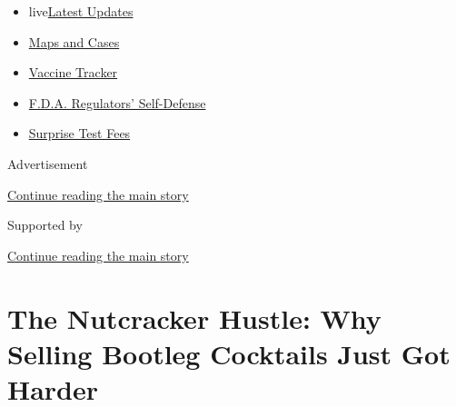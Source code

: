 \begin{itemize}
\tightlist
\item
  live\href{https://www.nytimes3xbfgragh.onion/2020/09/11/world/covid-19-coronavirus.html?name=styln-coronavirus-national\&region=TOP_BANNER\&block=storyline_menu_recirc\&action=click\&pgtype=Article\&impression_id=ab0b9241-f4bd-11ea-850c-d13f9cab80f0\&variant=undefined}{Latest
  Updates}
\item
  \href{https://www.nytimes3xbfgragh.onion/interactive/2020/us/coronavirus-us-cases.html?name=styln-coronavirus-national\&region=TOP_BANNER\&block=storyline_menu_recirc\&action=click\&pgtype=Article\&impression_id=ab0c2e80-f4bd-11ea-850c-d13f9cab80f0\&variant=undefined}{Maps
  and Cases}
\item
  \href{https://www.nytimes3xbfgragh.onion/interactive/2020/science/coronavirus-vaccine-tracker.html?name=styln-coronavirus-national\&region=TOP_BANNER\&block=storyline_menu_recirc\&action=click\&pgtype=Article\&impression_id=ab0c2e81-f4bd-11ea-850c-d13f9cab80f0\&variant=undefined}{Vaccine
  Tracker}
\item
  \href{https://www.nytimes3xbfgragh.onion/2020/09/10/us/politics/fda-coronavirus-vaccine.html?name=styln-coronavirus-national\&region=TOP_BANNER\&block=storyline_menu_recirc\&action=click\&pgtype=Article\&impression_id=ab0c2e82-f4bd-11ea-850c-d13f9cab80f0\&variant=undefined}{F.D.A.
  Regulators' Self-Defense}
\item
  \href{https://www.nytimes3xbfgragh.onion/2020/09/09/upshot/coronavirus-surprise-test-fees.html?name=styln-coronavirus-national\&region=TOP_BANNER\&block=storyline_menu_recirc\&action=click\&pgtype=Article\&impression_id=ab0c2e83-f4bd-11ea-850c-d13f9cab80f0\&variant=undefined}{Surprise
  Test Fees}
\end{itemize}

Advertisement

\protect\hyperlink{after-top}{Continue reading the main story}

Supported by

\protect\hyperlink{after-sponsor}{Continue reading the main story}

\hypertarget{the-nutcracker-hustle-why-selling-bootleg-cocktails-just-got-harder}{%
\section{The Nutcracker Hustle: Why Selling Bootleg Cocktails Just Got
Harder}\label{the-nutcracker-hustle-why-selling-bootleg-cocktails-just-got-harder}}

